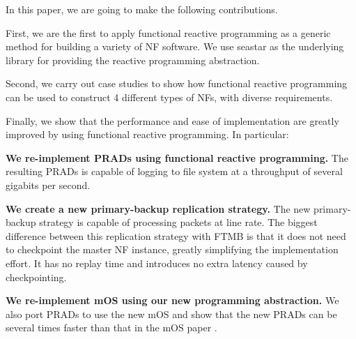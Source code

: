 In this paper, we are going to make the following contributions.

First, we are the first to apply functional reactive programming as a generic
method for building a variety of NF software. We use seastar as the underlying
library for providing the reactive programming abstraction.

Second, we carry out case studies to show how functional reactive programming
can be used to construct 4 different types of NFs, with diverse requirements.

Finally, we show that the performance and ease of implementation are greatly
improved by using functional reactive programming. In particular:

\noindent \textbf{We re-implement PRADs using functional reactive programming.}
The resulting PRADs is capable of logging to file system at a throughput of
several gigabits per second.

\noindent \textbf{We create a new primary-backup replication strategy.} The new
primary-backup strategy is capable of processing packets at line rate. The
biggest difference between this replication strategy with FTMB is that it does
not need to checkpoint the master NF instance, greatly simplifying the
implementation effort. It has no replay time and introduces no extra latency
caused by checkpointing.

\noindent \textbf{We re-implement mOS using our new programming abstraction.} We
also port PRADs to use the new mOS and show that the new PRADs can be several
times faster than that in the mOS paper \cite{201546}.


